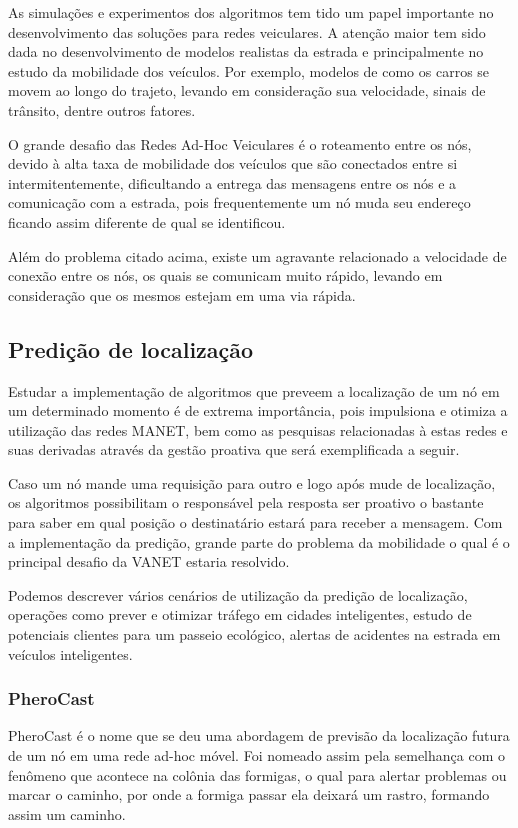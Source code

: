 \documentclass[12pt, %
openright, 
oneside,
a4paper,
brazil]{facom-ufu-abntex2}
\begin{document}
As simulações e experimentos dos algoritmos tem tido um papel importante no desenvolvimento das soluções para redes veiculares. A atenção maior tem sido dada no desenvolvimento de modelos realistas da estrada e principalmente no estudo da mobilidade dos veículos. Por exemplo, modelos de como os carros se movem ao longo do trajeto, levando em consideração sua velocidade, sinais de trânsito, dentre outros fatores. \cite{6710069} 

O grande desafio das Redes Ad-Hoc Veiculares é o roteamento entre os nós, devido à alta taxa de mobilidade dos veículos que são conectados entre si intermitentemente, dificultando a entrega das mensagens entre os nós e a comunicação com a estrada, pois frequentemente um nó muda seu endereço ficando assim diferente de qual se identificou.

Além do problema citado acima, existe um agravante relacionado a velocidade de conexão entre os nós, os quais se comunicam muito rápido, levando em consideração que os mesmos estejam em uma via rápida.

\subsection{Predição de localização}
Estudar a implementação de algoritmos que preveem a localização de um nó em um determinado momento é de extrema importância, pois impulsiona e otimiza a utilização das redes \ac{MANET}, bem como as pesquisas relacionadas à estas redes e suas derivadas através da gestão proativa que será exemplificada a seguir.  \cite{6838650}

Caso um nó mande uma requisição para outro e logo após mude de localização, os algoritmos possibilitam o responsável pela resposta ser proativo o bastante para saber em qual posição o destinatário estará para receber a mensagem. Com a implementação da predição, grande parte do problema da mobilidade o qual é o principal desafio da \ac{VANET} estaria resolvido.

Podemos descrever vários cenários de utilização da predição de localização, operações como prever e otimizar tráfego em cidades inteligentes, estudo de potenciais clientes para um passeio ecológico, alertas de acidentes na estrada em veículos inteligentes.

\subsubsection{PheroCast}
PheroCast é o nome que se deu uma abordagem de previsão da localização futura de um nó em uma rede ad-hoc móvel. Foi nomeado assim pela semelhança com o fenômeno que acontece na colônia das formigas, o qual para alertar problemas ou marcar o caminho, por onde a formiga passar ela deixará um rastro, formando assim um caminho.
\end{document}
